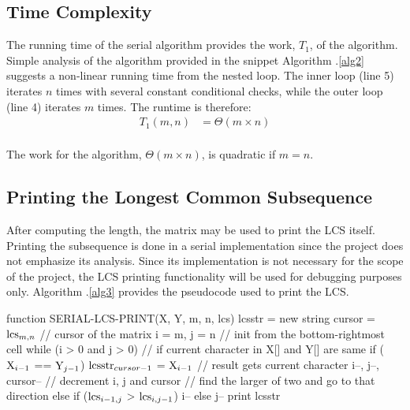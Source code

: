 \documentclass[usletter, 11pt]{extarticle}
\newcommand{\V}[1]{\textup{#1}}
\newcommand{\lcs}{\V{lcs}}
\newcommand{\seqone}{\V{X}}
\newcommand{\seqtwo}{\V{Y}}
\newcommand{\lcsstr}{\V{lcsstr}}
\begin{document}
        \vspace{-1in}
        \subsection{Time Complexity} The running time of the serial algorithm
        provides the work, $T_{1}$, of the algorithm. Simple analysis of the
        algorithm provided in the snippet Algorithm \thesection .\ref{alg2}
        suggests a non-linear running time from the nested loop. The inner
        loop (line 5) iterates $n$ times with several constant conditional
        checks, while the outer loop (line 4) iterates $m$ times. The runtime
        is therefore:
        \begin{equation*}
            \begin{split}
                T_1(m, n) & = \Theta(m \times n) \\
            \end{split}
        \end{equation*}

        The work for the algorithm, $\Theta(m \times n)$, is quadratic if $m =
        n$.

        \subsection{Printing the Longest Common Subsequence} After computing
        the length, the matrix may be used to print the LCS itself. Printing
        the subsequence is done in a serial implementation since the project
        does not emphasize its analysis. Since its implementation is not
        necessary for the scope of the project, the LCS printing functionality
        will be used for debugging purposes only. Algorithm \thesection
        .\ref{alg3} provides the pseudocode used to print the LCS.

\begin{pseudocode}[caption={Serial Longest Common Subsequence Printing},
label={alg3}]
function SERIAL-LCS-PRINT(X, Y, m, n, lcs)
    lcsstr = new string
    cursor = $\lcs_{m,n}$ // cursor of the matrix
    i = m, j = n // init from the bottom-rightmost cell
    while (i > 0 and j > 0)
        // if current character in X[] and Y[] are same
        if ($\seqone_{i - 1}$ == $\seqtwo_{j - 1}$)
            $\lcsstr_{cursor - 1}$ = $\seqone_{i - 1}$  // result gets current character
            i--, j--, cursor-- // decrement i, j and cursor
        // find the larger of two and go to that direction
        else if ($\lcs_{i - 1, j}$ > $\lcs_{i,j - 1}$)
            i--
        else
            j--
    print lcsstr

\end{pseudocode}
\end{document}
